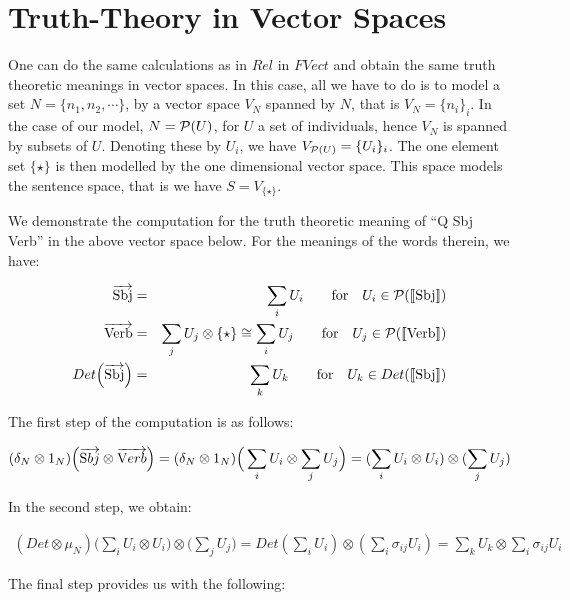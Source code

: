 \section{Truth-Theory in Vector Spaces} 

One can do the same calculations as in $Rel$ in $FVect$ and obtain the same truth theoretic meanings in vector spaces. In this case, all we have to do is to model a set $N = \{n_1, n_2, \cdots\}$, by a vector space $V_N$ spanned by $N$, that is $V_N = \{n_i\}_i$. In the case of our model, $N = {\cal P}(U)$, for $U$ a set of individuals, hence $V_N$ is spanned by subsets of $U$.  Denoting these by $U_i$, we have $V_{{\cal P}(U)} = \{U_i\}_i$. The one element set $\{\star\}$ is then modelled  by the one dimensional vector space. This space models the sentence space, that is we have $S = V_{\{\star\}}$.  

We demonstrate the computation for the truth theoretic meaning of ``Q Sbj Verb'' in the above vector space below. For the meanings of the words therein, we have:

\begin{eqnarray*}
\overrightarrow{\text{Sbj}} &=& \sum_i U_i \qquad \text{for} \quad U_i \in {\cal P}([\![ \text{Sbj} ]\!])\\
\overrightarrow{\text{Verb}} &=& \sum_j U_j  \otimes \{\star\} \cong \sum_i U_j  \qquad \text{for} \quad  U_j \in {\cal P}([\![ \text{Verb} ]\!])\\
Det\Big(\overrightarrow{\text{Sbj}}\Big) &=& \sum_k U_k \qquad \text{for} \quad   U_k \in Det([\![ \text{Sbj} ]\!])
\end{eqnarray*}




The first step of the computation  is as follows:


\begin{align*}
(\delta_N \otimes 1_{N})\Big(\overrightarrow{\text Sbj} \otimes \overrightarrow{\text Verb}\Big) =   (\delta_N \otimes 1_{N})\Big(\sum_i {U}_i  \otimes \sum_j {U}_j \Big ) = (\sum_i {U}_i \otimes {U}_i) \otimes (\sum_j {U}_j)
\end{align*}

\noindent
In the second step, we obtain:

\begin{align*}
(Det \otimes  \mu_N)\Big(\sum_i {U}_i \otimes {U}_i) \otimes (\sum_j {U}_j\Big) =  Det(\sum_i {U}_i) \otimes  (\sum_i \sigma_{ij} {U}_i)   = \sum_k U_k \otimes \sum_i \sigma_{ij} U_i
\end{align*}

\noindent
The final step  provides us with the following:

